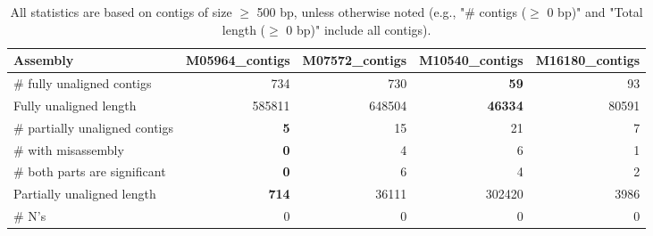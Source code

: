 \documentclass[12pt,a4paper]{article}
\begin{document}
\begin{table}[ht]
\begin{center}
\caption{All statistics are based on contigs of size $\geq$ 500 bp, unless otherwise noted (e.g., "\# contigs ($\geq$ 0 bp)" and "Total length ($\geq$ 0 bp)" include all contigs).}
\begin{tabular}{|l*{4}{|r}|}
\hline
Assembly & M05964\_contigs & M07572\_contigs & M10540\_contigs & M16180\_contigs \\ \hline
\# fully unaligned contigs & 734 & 730 & {\bf 59} & 93 \\ \hline
Fully unaligned length & 585811 & 648504 & {\bf 46334} & 80591 \\ \hline
\# partially unaligned contigs & {\bf 5} & 15 & 21 & 7 \\ \hline
\hspace{5mm}\# with misassembly & {\bf 0} & 4 & 6 & 1 \\ \hline
\hspace{5mm}\# both parts are significant & {\bf 0} & 6 & 4 & 2 \\ \hline
Partially unaligned length & {\bf 714} & 36111 & 302420 & 3986 \\ \hline
\# N's & 0 & 0 & 0 & 0 \\ \hline
\end{tabular}
\end{center}
\end{table}
\end{document}
